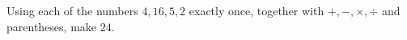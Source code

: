 Using each of the numbers $4,16,5,2$ exactly once, together with $+,-,\times,\div$ and parentheses, make $24$.
